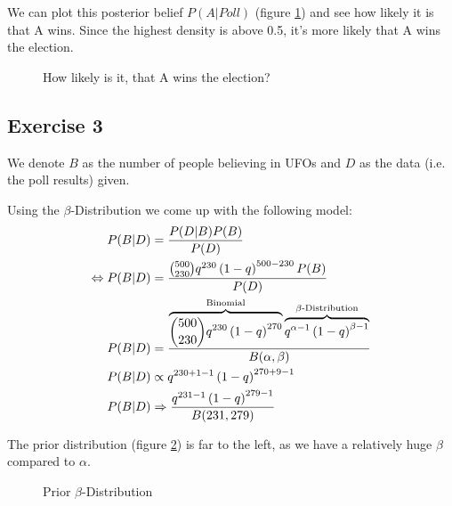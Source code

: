 \documentclass[../main/Notes.tex]{subfiles}
\begin{document}
We can plot this posterior belief $P(A|Poll)$ (figure \ref{fig:2014-05-30_ex2plot}) and see how likely it is that A wins. Since the highest density is above 0.5, it's more likely that A wins the election.
\begin{figure}[!ht]
\centering
{}
\caption{How likely is it, that A wins the election?}
\label{fig:2014-05-30_ex2plot}
\end{figure}


\subsection*{Exercise 3}
We denote $B$ as the number of people believing in UFOs and $D$ as the data (i.e. the poll results) given.

Using the $\beta$-Distribution we come up with the following model:
\begin{align*}\index{Binomial Distribution}
                P(B|D) &= \frac{P(D|B)P(B)}{P(D)} \\
\Leftrightarrow P(B|D) &= \frac{\binom{500}{230}q^{230}\left(1-q\right)^{500-230}P(B)}{P(D)}\\
                P(B|D) &= \frac{\overbrace{\binom{500}{230}q^{230}\left(1-q\right)^{270}}^\text{Binomial} \overbrace{q^{\alpha-1}\left(1-q\right)^{\beta-1}}^\text{$\beta$-Distribution}}{B(\alpha,\beta)} \\
                P(B|D) &\propto q^{230+1-1}\left(1-q\right)^{270+9-1} \\
                P(B|D) &\Rightarrow \frac{q^{231-1}\left(1-q\right)^{279-1}}{B(231,279)}
\end{align*}

The prior distribution (figure \ref{fig:2014-05-30_ex3prior}) is far to the left, as we have a relatively huge $\beta$ compared to $\alpha$.
\begin{figure}[!ht]
\centering
{}
\caption{Prior $\beta$-Distribution}
\label{fig:2014-05-30_ex3prior}
\end{figure}
\end{document}
